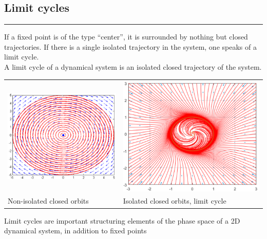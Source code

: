 \subsection{Limit cycles}
\noindent\rule[\linienAbstand]{\linewidth}{\linienDicke}
If a fixed point is of the type ``center'', it is surrounded by nothing but closed trajectories. If there is a single isolated trajectory in the system, one speaks of a limit cycle.\\
A limit cycle of a dynamical system is an isolated closed trajectory of the system.
\begin{table}[H]
  \setlength{\tabcolsep}{0.2em}
  \footnotesize
  \centering
  \begin{tabular}{p{}@{\hskip 1em}p{}}
    \centering
    \includegraphics[width=0.9\linewidth]{Pics/4.16.png} &
    \includegraphics[width=0.9\linewidth]{Pics/4.34.png}\\
    Non-isolated closed orbits & Isolated closed orbits, limit cycle
  \end{tabular}
\end{table}
Limit cycles are important structuring elements of the phase space of a 2D dynamical system, in addition to fixed points\\


